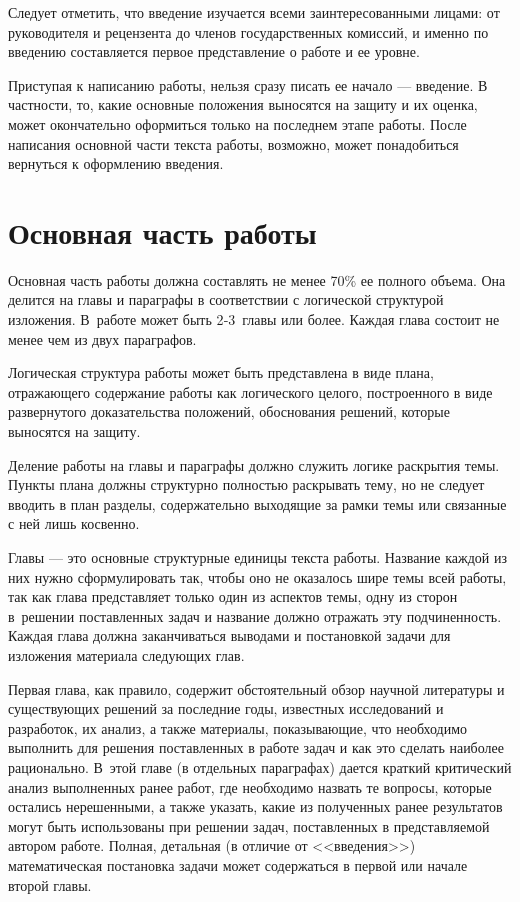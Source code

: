 \documentclass[PI,VKR]{HSEUniversityPractice}
\begin{document}
Следует отметить, что введение изучается всеми заинтересованными лицами: от руководителя и рецензента до членов государственных комиссий, 
и именно по введению составляется первое представление о работе и ее уровне.

Приступая к написанию работы, нельзя сразу писать ее начало --- введение.
В частности, то, какие основные положения выносятся на защиту и их оценка, может окончательно оформиться только на последнем этапе работы. После написания основной части текста работы, возможно, может понадобиться вернуться к оформлению введения. 

\chapter{Основная часть работы}

Основная часть работы должна составлять не менее 70\% ее полного объема. Она делится на главы и параграфы в соответствии с логической структурой изложения. В работе может быть 2‑3 главы или более. Каждая глава состоит не менее чем из двух параграфов.

Логическая структура работы может быть представлена в виде плана, отражающего содержание работы как логического целого, построенного в виде развернутого доказательства положений, обоснования решений, которые выносятся на защиту.

Деление работы на главы и параграфы должно служить логике раскрытия темы. Пункты плана должны структурно полностью раскрывать тему, но не следует вводить в план разделы, содержательно выходящие за рамки темы или связанные с ней лишь косвенно.

Главы --- это основные структурные единицы текста работы. Название каждой из них нужно сформулировать так, чтобы оно не оказалось шире темы всей работы, так как глава представляет только один из аспектов темы, одну из сторон в решении поставленных задач и название должно отражать эту подчиненность.
Каждая глава должна заканчиваться выводами и постановкой задачи для изложения материала следующих глав.

Первая глава, как правило, содержит обстоятельный обзор научной литературы и существующих решений за последние годы, известных исследований и разработок, их анализ, а также материалы, показывающие, что необходимо выполнить для решения поставленных в работе задач и как это сделать наиболее рационально. В этой главе (в отдельных параграфах) дается краткий критический анализ выполненных ранее работ, где необходимо назвать те вопросы, которые остались нерешенными, а также указать, какие из полученных ранее результатов могут быть использованы при решении задач, поставленных в представляемой автором работе. Полная, детальная (в отличие от <<введения>>) математическая постановка задачи может содержаться в первой или начале второй главы.
\end{document}

